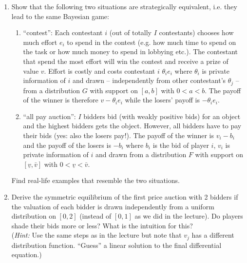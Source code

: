 \documentclass[a4paper,12pt]{article}
\begin{document}
\begin{enumerate}[resume]
\item\label{ex:stratEq} Show that the following two situations are strategically equivalent, i.e. they lead to the same Bayesian game:
  \begin{enumerate}
  \item ``contest'': Each contestant $i$ (out of totally $I$ contestants) chooses how much effort $e_i$ to spend in the contest (e.g. how much time to spend on the task or how much money to spend in lobbying etc.). The contestant that spend the most effort will win the contest and receive a prize of value $v$. Effort is costly and costs contestant $i$ $\theta _ie_i$ where $\theta _i$ is private information of $i$ and drawn -- independently from other contestant's $\theta _j$ -- from a distribution $G$ with support on $[a,b]$ with $0<a<b$. The payoff of the winner is therefore $v-\theta _ie_i$ while the losers' payoff is $-\theta _ie_i$.
  \item ``all pay auction'': $I$ bidders bid (with weakly positive bids) for an object and the highest bidders gets the object. However, all bidders have to pay their bids (yes: also the losers pay!). The payoff of the winner is $v_i -b_i$ and the payoff of the losers is $-b_i$ where $b_i$ is the bid of player $i$, $v_i$ is private information of $i$ and drawn from a distribution $F$ with support on $[\underline{v},\bar{v}]$ with $0<\underline{v}<\bar{v}$.
  \end{enumerate}
  Find real-life examples that resemble the two situations.
\item Derive the symmetric equilibrium of the first price auction with 2 bidders if the valuation of each bidder is drawn independently from a uniform distribution on $[0,2]$ (instead of $[0,1]$ as we did in the lecture). Do players shade their bids more or less? What is the intuition for this?\\
  (\emph{Hint:} Use the same steps as in the lecture but note that $v_j$ has a different distribution function. ``Guess'' a linear solution to the final differential equation.)

\end{enumerate}
\end{document}
